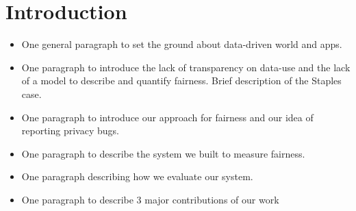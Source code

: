 
\section{Introduction}
\begin{itemize}
  \item One general paragraph to set the ground about data-driven world and apps.
  \item One paragraph to introduce the lack of transparency on data-use
    and the lack of a model to describe and quantify fairness. Brief description of the
    Staples case.
  \item One paragraph to introduce our approach for fairness and our
    idea of reporting privacy bugs.
  \item One paragraph to describe the system we built to measure fairness.
  \item One paragraph describing how we evaluate our system.
  \item One paragraph to describe 3 major contributions of our work
\end{itemize}
%

